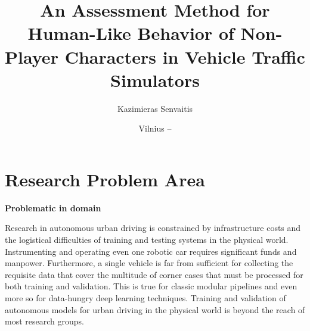 \documentclass{VUMIFPS-master-intro}
\title{An Assessment Method for Human-Like Behavior of Non-Player Characters in Vehicle Traffic Simulators}
\author{Kazimieras Senvaitis}
\date{Vilnius – \the\year}
\begin{document}
\maketitle




\section{Research Problem Area}

\textbf{Problematic in domain}

Research in autonomous urban driving is constrained by infrastructure costs and the logistical difficulties of training and testing systems in the physical world. Instrumenting and operating even one robotic car requires significant funds and manpower. Furthermore, a single vehicle is far from sufficient for collecting the requisite data that cover the multitude of corner cases that must be processed for both training and validation. This is true for classic modular pipelines and even more so for data-hungry deep learning techniques. Training and validation of autonomous models for urban driving in the physical world is beyond the reach of most research groups. \cite{Dosovitskiy2017}


\end{document}
